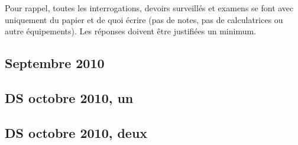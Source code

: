
Pour rappel, toutes les interrogations, devoirs surveillés et examens se font avec uniquement du papier et de quoi écrire (pas de notes, pas de calculatrices ou autre équipements). Les réponses doivent être justifiées un minimum.

\subsection{Septembre 2010}


\subsection{DS octobre 2010, un}


\subsection{DS octobre 2010, deux}



\clearpage

